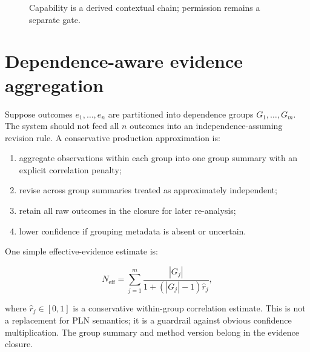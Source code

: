 \documentclass[11pt,oneside]{report}
\begin{document}
\begin{figure}[H]
\centering
{}
\caption{Capability is a derived contextual chain; permission remains a separate gate.}
\label{fig:capability-chain}
\end{figure}

\section{Dependence-aware evidence aggregation}

Suppose outcomes $e_1,\ldots,e_n$ are partitioned into dependence groups $G_1,\ldots,G_m$. The system should not feed all $n$ outcomes into an independence-assuming revision rule. A conservative production approximation is:

\begin{enumerate}
  \item aggregate observations within each group into one group summary with an explicit correlation penalty;
  \item revise across group summaries treated as approximately independent;
  \item retain all raw outcomes in the closure for later re-analysis;
  \item lower confidence if grouping metadata is absent or uncertain.
\end{enumerate}

One simple effective-evidence estimate is:

\[
N_{\mathrm{eff}}=\sum_{j=1}^{m}\frac{|G_j|}{1+(|G_j|-1)\hat{r}_j},
\]

where $\hat{r}_j\in[0,1]$ is a conservative within-group correlation estimate. This is not a replacement for PLN semantics; it is a guardrail against obvious confidence multiplication. The group summary and method version belong in the evidence closure.
\end{document}
